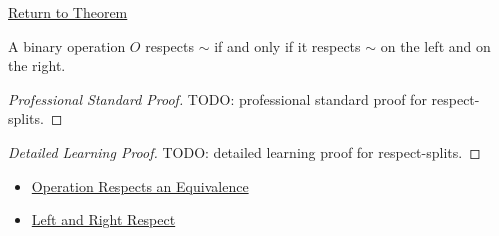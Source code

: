\newpage
{}
\label{prf:respect-splits}

\begin{remark*}[Return]
\hyperref[lem:respect-splits]{Return to Theorem}
\end{remark*}

\begin{lemma*}
A binary operation $O$ respects $\sim$ if and only if it respects $\sim$ on
the left and on the right.
\end{lemma*}

\begin{proof}[Professional Standard Proof]
\LRAProofBodyStart
TODO: professional standard proof for respect-splits.
\end{proof}

\begin{proof}[Detailed Learning Proof]
\LRAProofBodyStart
TODO: detailed learning proof for respect-splits.
\end{proof}

\begin{remark*}
\end{remark*}

\begin{dependencies}
\begin{itemize}
  \item \hyperref[def:operation-respects-equivalence]{Operation Respects an Equivalence}
  \item \hyperref[def:left-right-respect-equivalence]{Left and Right Respect}
\end{itemize}
\end{dependencies}

\clearpage
